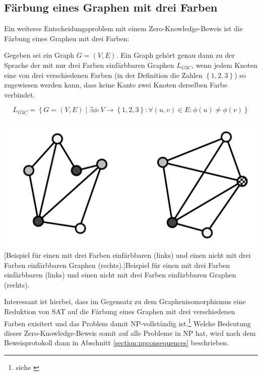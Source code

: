 \subsection{Färbung eines Graphen mit drei Farben}
Ein weiteres Entscheidungsproblem mit einem Zero-Knowledge-Beweis ist die Färbung eines Graphen mit drei Farben:

\vspace{0.2cm}

\begin{definition}[G3C]
Gegeben sei ein Graph \( G = \left( V, E \right) \). Ein Graph gehört genau dann zu der Sprache der mit nur drei Farben einfärbbaren Graphen \( L_{G3C} \), wenn jedem Knoten eine von drei verschiedenen Farben (in der Definition die Zahlen \( \left\lbrace 1, 2, 3\right\rbrace \)) so zugewiesen werden kann, dass keine Kante zwei Knoten derselben Farbe verbindet.

\[ 
L_{G3C} = \left\lbrace G = \left( V, E \right) \mid \exists \phi: V \rightarrow \left\lbrace 1, 2, 3\right\rbrace: \forall \left( u, v \right) \in E: \phi \left( u \right) \neq \phi \left( v \right) \right\rbrace	
\]
\end{definition}

\vspace{1em}
\begin{minipage}{\linewidth}
	\centering
	\includegraphics[width=0.7\linewidth]{img/3colorgraphs-example.pdf}
	[Beispiel für einen mit drei Farben einfärbbaren (links) und einen nicht mit drei Farben einfärbbaren Graphen (rechts).]{Beispiel für einen mit drei Farben einfärbbaren (links) und einen nicht mit drei Farben einfärbbaren Graphen (rechts).}
	\label{fig:3coloringexample}
\end{minipage}

\vspace{0.2cm}

Interessant ist hierbei, dass im Gegensatz zu dem Graphenisomorphismus eine Reduktion von SAT auf die Färbung eines Graphen mit drei verschiedenen Farben exisitert und das Problem damit NP-vollständig ist.\footnote{siehe \cite[Seite 14]{np}} Welche Bedeutung dieser Zero-Knowledge-Beweis somit auf alle Probleme in NP hat, wird nach dem Beweisprotokoll dann in Abschnitt \ref{section:npconsequences} beschrieben. 

